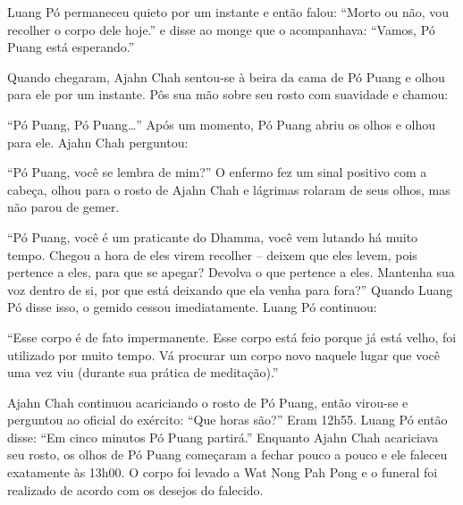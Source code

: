Luang Pó permaneceu quieto por um instante e então falou: ``Morto ou
não, vou recolher o corpo dele hoje.'' e disse ao monge que o
acompanhava: ``Vamos, Pó Puang está esperando.''

Quando chegaram, Ajahn Chah sentou-se à beira da cama de Pó Puang e
olhou para ele por um instante. Pôs sua mão sobre seu rosto com
suavidade e chamou:

``Pó Puang, Pó Puang\ldots{}'' Após um momento, Pó Puang abriu os olhos
e olhou para ele. Ajahn Chah perguntou:

``Pó Puang, você se lembra de mim?'' O enfermo fez um sinal positivo com
a cabeça, olhou para o rosto de Ajahn Chah e lágrimas rolaram de seus
olhos, mas não parou de gemer.

``Pó Puang, você é um praticante do Dhamma, você vem lutando há muito
tempo. Chegou a hora de eles virem recolher -- deixem que eles levem,
pois pertence a eles, para que se apegar? Devolva o que pertence a eles.
Mantenha sua voz dentro de si, por que está deixando que ela venha para
fora?'' Quando Luang Pó disse isso, o gemido cessou imediatamente. Luang
Pó continuou:

``Esse corpo é de fato impermanente. Esse corpo está feio porque já está
velho, foi utilizado por muito tempo. Vá procurar um corpo novo naquele
lugar que você uma vez viu (durante sua prática de meditação).''

Ajahn Chah continuou acariciando o rosto de Pó Puang, então virou-se e
perguntou ao oficial do exército: ``Que horas são?'' Eram 12h55. Luang
Pó então disse: ``Em cinco minutos Pó Puang partirá.'' Enquanto Ajahn
Chah acariciava seu rosto, os olhos de Pó Puang começaram a fechar pouco
a pouco e ele faleceu exatamente às 13h00. O corpo foi levado a Wat Nong
Pah Pong e o funeral foi realizado de acordo com os desejos do falecido.
